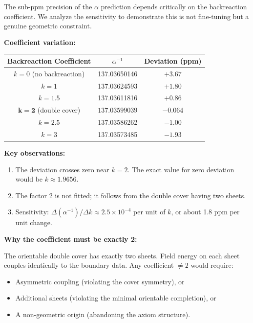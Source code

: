 The sub-ppm precision of the $\alpha$ prediction depends critically on the backreaction 
coefficient. We analyze the sensitivity to demonstrate this is not fine-tuning but 
a genuine geometric constraint.

\textbf{Coefficient variation:}
\begin{center}
\begin{tabular}{@{}ccc@{}}
\toprule
\textbf{Backreaction Coefficient} & $\alpha^{-1}$ & \textbf{Deviation (ppm)}\\
\midrule
$k = 0$ (no backreaction) & 137.03650146 & $+3.67$\\
$k = 1$ & 137.03624593 & $+1.80$\\
$k = 1.5$ & 137.03611816 & $+0.86$\\
$\mathbf{k = 2}$ (double cover) & $\mathbf{137.03599039}$ & $\mathbf{-0.064}$\\
$k = 2.5$ & 137.03586262 & $-1.00$\\
$k = 3$ & 137.03573485 & $-1.93$\\
\bottomrule
\end{tabular}
\end{center}

\textbf{Key observations:}
\begin{enumerate}[leftmargin=1.5em, topsep=2pt, itemsep=1pt]
    \item The deviation crosses zero near $k = 2$. The exact value for zero deviation 
        would be $k \approx 1.9656$.
    \item The factor 2 is not fitted; it follows from the double cover having two sheets.
    \item Sensitivity: $\Delta(\alpha^{-1})/\Delta k \approx 2.5 \times 10^{-4}$ per unit of $k$, 
        or about 1.8 ppm per unit change.
\end{enumerate}

\textbf{Why the coefficient must be exactly 2:}

The orientable double cover has exactly two sheets. Field energy on each sheet couples 
identically to the boundary data. Any coefficient $\neq 2$ would require:
\begin{itemize}[leftmargin=1.5em, topsep=2pt, itemsep=1pt]
    \item Asymmetric coupling (violating the cover symmetry), or
    \item Additional sheets (violating the minimal orientable completion), or
    \item A non-geometric origin (abandoning the axiom structure).
\end{itemize}


